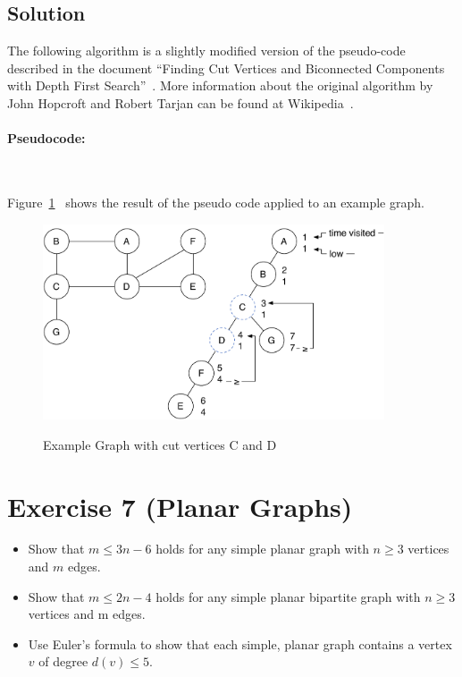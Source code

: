 \documentclass[a4paper, 12pt]{report}
\begin{document}
\subsection{Solution}

The following algorithm is a slightly modified version of the pseudo-code
described in the document “Finding Cut Vertices and Biconnected Components with
Depth First Search”~\cite{Finding_Cut_Vertices}. More information about the
original algorithm by John Hopcroft and Robert Tarjan can be found at
Wikipedia~\cite{Wikipedia_Connected_Components}.

\paragraph{Pseudocode:}~

\begin{leftbar}
    
\end{leftbar}

Figure~\ref{figure:Cut_Vertices}~\cite{Solutions_Exercise1_Hamboeck} shows the
result of the pseudo code applied to an example graph.

\begin{figure}[htbp]
    \caption{Example Graph with cut vertices C and D}
    \vskip 0.2cm
    \centering
    \includegraphics[width=0.9\textwidth]{Figures/Cut_Vertices}
    \label{figure:Cut_Vertices}
\end{figure}

\section{Exercise 7 (Planar Graphs)}

\begin{itemize}

    \item Show that $m ≤ 3n − 6$ holds for any simple planar graph with $n ≥ 3$
    vertices and $m$ edges.

    \item Show that $m ≤ 2n − 4$ holds for any simple planar bipartite graph
    with $n ≥ 3$ vertices and m edges.

    \item Use Euler’s formula to show that each simple, planar graph contains a
    vertex $v$ of degree $d(v) ≤ 5$.

\end{itemize}
\end{document}
